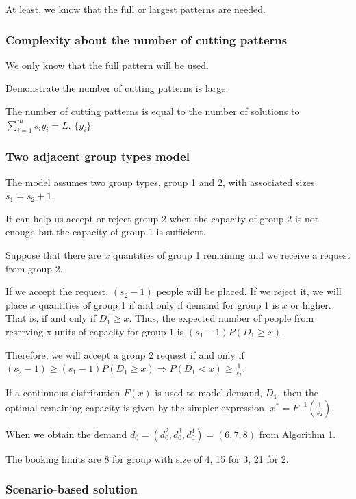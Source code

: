 At least, we know that the full or largest patterns are needed.

\subsubsection{Complexity about the number of cutting patterns}
We only know that the full pattern will be used.

Demonstrate the number of cutting patterns is large.

The number of cutting patterns is equal to the number of solutions to $\sum_{i=1}^m s_i y_i = L$. $\{y_i\}$

\subsubsection{Two adjacent group types model}\label{sec_adjacent}
The model assumes two group types, group 1 and 2, with associated sizes $s_1 = s_2 + 1$.

It can help us accept or reject group 2 when the capacity of group 2 is not enough but the capacity of group 1 is sufficient.

Suppose that there are $x$ quantities of group 1 remaining and we receive a request from group 2.

If we accept the request, $(s_2 -1)$ people will be placed. If we reject it, we will place $x$ quantities of group 1 if and only if demand for group 1 is $x$ or higher. That is, if and only if $D_1 \geq x$. Thus, the expected number of people from reserving x units of capacity for group 1 is $(s_1-1)P(D_1 \geq x)$.

Therefore, we will accept a group 2 request if and only if $(s_{2}-1) \geq (s_{1}-1) P\left(D_{1} \geq x\right)
\Rightarrow P(D_1 < x) \geq \frac{1}{s_2}$.

If a continuous distribution $F(x)$ is used to model demand, $D_1$, then the optimal remaining capacity is given by the simpler expression, $x^{*} = F^{-1}(\frac{1}{s_2})$.

When we obtain the demand $d_0 = (d_0^2, d_0^3, d_0^4) = (6,7,8)$ from Algorithm 1.

The booking limits are 8 for group with size of 4, 15 for 3, 21 for 2.

\subsubsection{Scenario-based solution}

